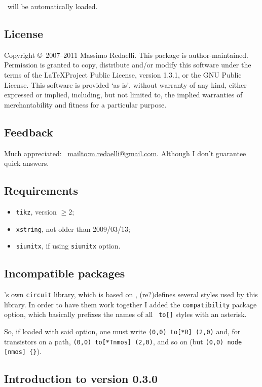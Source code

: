 \documentclass[a4paper]{article}
\newcommand{\email}[2][]{\def\temp{#1}\ifx\temp\empty\Email~\fi\href{mailto:#2}{#2}}
\begin{document}
\TikZ\ will be automatically loaded.

\subsection{License}
Copyright \copyright\ 2007--2011 Massimo Redaelli. This package is author-maintained.
Permission is granted to copy, distribute and/or modify this software under the
terms of the \LaTeX Project Public License, version 1.3.1, or the GNU Public License. This software is provided ‘as is’, without warranty of any kind, either expressed or implied, including, but not limited to, the implied warranties of merchantability and fitness for a
particular purpose.

\subsection{Feedback}
Much appreciated: \email{mailto:m.redaelli@gmail.com}. Although I don't guarantee quick answers.

\subsection{Requirements}
\begin{itemize}
 \item \texttt{tikz}, version $\ge 2$;
 \item \texttt{xstring}, not older than 2009/03/13;
 \item \texttt{siunitx}, if using \texttt{siunitx} option.
\end{itemize}

\subsection{Incompatible packages}

\TikZ's own \texttt{circuit} library, which is based on \Circuitikz, (re?)defines several styles used by this library. In order to have them work together I added the \texttt{compatibility} package option, which basically prefixes the names of all \Circuitikz\ \texttt{to[]} styles with an asterisk.

So, if loaded with said option, one must write \verb!(0,0) to[*R] (2,0)! and, for transistors on a path, \verb!(0,0) to[*Tnmos] (2,0)!, and so on (but \verb!(0,0) node [nmos] {}!). 

\subsection{Introduction to version 0.3.0}
\end{document}
